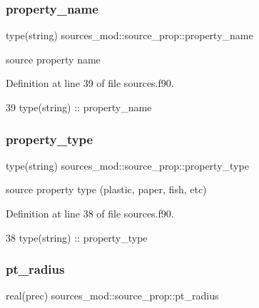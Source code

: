 \subsubsection{\texorpdfstring{property\+\_\+name}{property\_name}}
{\footnotesize\ttfamily type(string) sources\+\_\+mod\+::source\+\_\+prop\+::property\+\_\+name\hspace{0.3cm}{\ttfamily [private]}}



source property name 



Definition at line 39 of file sources.\+f90.


\begin{DoxyCode}
39         \textcolor{keywordtype}{type}(string) :: property\_name
\end{DoxyCode}
\mbox{\label{structsources__mod_1_1source__prop_a071dfa986af6218c0add70010ab2a37e}} 
\subsubsection{\texorpdfstring{property\+\_\+type}{property\_type}}
{\footnotesize\ttfamily type(string) sources\+\_\+mod\+::source\+\_\+prop\+::property\+\_\+type\hspace{0.3cm}{\ttfamily [private]}}



source property type (plastic, paper, fish, etc) 



Definition at line 38 of file sources.\+f90.


\begin{DoxyCode}
38         \textcolor{keywordtype}{type}(string) :: property\_type
\end{DoxyCode}
\mbox{\label{structsources__mod_1_1source__prop_a66219c6ba24db75abf401de5c5fa875d}} 
\subsubsection{\texorpdfstring{pt\+\_\+radius}{pt\_radius}}
{\footnotesize\ttfamily real(prec) sources\+\_\+mod\+::source\+\_\+prop\+::pt\+\_\+radius\hspace{0.3cm}{\ttfamily [private]}}



